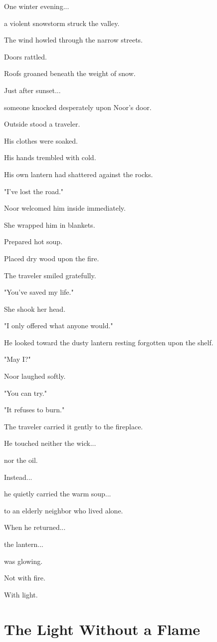 \documentclass[12pt,openany]{book}
\begin{document}
One winter evening...

a violent snowstorm struck the valley.

The wind howled through the narrow streets.

Doors rattled.

Roofs groaned beneath the weight of snow.

Just after sunset...

someone knocked desperately upon Noor's door.

Outside stood a traveler.

His clothes were soaked.

His hands trembled with cold.

His own lantern had shattered against the rocks.

"I've lost the road."

Noor welcomed him inside immediately.

She wrapped him in blankets.

Prepared hot soup.

Placed dry wood upon the fire.

The traveler smiled gratefully.

"You've saved my life."

She shook her head.

"I only offered what anyone would."

He looked toward the dusty lantern resting forgotten upon the shelf.

"May I?"

Noor laughed softly.

"You can try."

"It refuses to burn."

The traveler carried it gently to the fireplace.

He touched neither the wick...

nor the oil.

Instead...

he quietly carried the warm soup...

to an elderly neighbor who lived alone.

When he returned...

the lantern...

was glowing.

Not with fire.

With light.
\section*{The Light Without a Flame}
\end{document}
